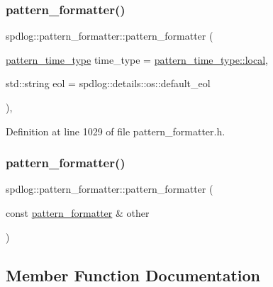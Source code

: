 \subsubsection{\texorpdfstring{pattern\+\_\+formatter()}{pattern\_formatter()}\hspace{0.1cm}{\footnotesize\ttfamily [2/3]}}
{\footnotesize\ttfamily spdlog\+::pattern\+\_\+formatter\+::pattern\+\_\+formatter (\begin{DoxyParamCaption}\item[{\hyperlink{namespacespdlog_ad598fbd8338772e66ae09e8723a07ced}{pattern\+\_\+time\+\_\+type}}]{time\+\_\+type = {\ttfamily \hyperlink{namespacespdlog_ad598fbd8338772e66ae09e8723a07cedaf5ddaf0ca7929578b408c909429f68f2}{pattern\+\_\+time\+\_\+type\+::local}},  }\item[{std\+::string}]{eol = {\ttfamily spdlog\+:\+:details\+:\+:os\+:\+:default\+\_\+eol} }\end{DoxyParamCaption})\hspace{0.3cm}{\ttfamily [inline]}, {\ttfamily [explicit]}}



Definition at line 1029 of file pattern\+\_\+formatter.\+h.

\mbox{\label{classspdlog_1_1pattern__formatter_a3c7051314c9422b667e254cb27d81b80}} 
\subsubsection{\texorpdfstring{pattern\+\_\+formatter()}{pattern\_formatter()}\hspace{0.1cm}{\footnotesize\ttfamily [3/3]}}
{\footnotesize\ttfamily spdlog\+::pattern\+\_\+formatter\+::pattern\+\_\+formatter (\begin{DoxyParamCaption}\item[{const \hyperlink{classspdlog_1_1pattern__formatter}{pattern\+\_\+formatter} \&}]{other }\end{DoxyParamCaption})\hspace{0.3cm}{\ttfamily [delete]}}



\subsection{Member Function Documentation}
\mbox{\label{classspdlog_1_1pattern__formatter_a73a60f53c23e860a2c1229c0781819f9}} 
